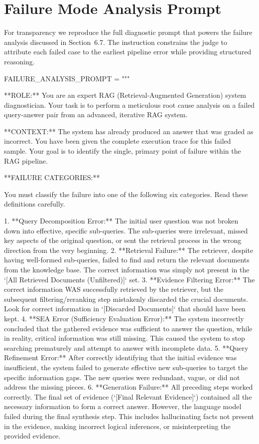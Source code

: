 \documentclass[11pt]{article}
\begin{document}
\section{Failure Mode Analysis Prompt}
\label{sec:appendix-failure}

For transparency we reproduce the full diagnostic prompt that powers the failure analysis discussed in Section~6.7. The instruction constrains the judge to attribute each failed case to the earliest pipeline error while providing structured reasoning.

\begin{PromptBlock}
FAILURE_ANALYSIS_PROMPT = """

**ROLE:** You are an expert RAG (Retrieval-Augmented Generation) system diagnostician. Your task is to perform a meticulous root cause analysis on a failed query-answer pair from an advanced, iterative RAG system.

**CONTEXT:** The system has already produced an answer that was graded as incorrect. You have been given the complete execution trace for this failed sample. Your goal is to identify the single, primary point of failure within the RAG pipeline.

**FAILURE CATEGORIES:**

You must classify the failure into one of the following six categories. Read these definitions carefully.

1.  **Query Decomposition Error:** The initial user question was not broken down into effective, specific sub-queries. The sub-queries were irrelevant, missed key aspects of the original question, or sent the retrieval process in the wrong direction from the very beginning.
2.  **Retrieval Failure:** The retriever, despite having well-formed sub-queries, failed to find and return the relevant documents from the knowledge base. The correct information was simply not present in the `[All Retrieved Documents (Unfiltered)]` set.
3.  **Evidence Filtering Error:** The correct information WAS successfully retrieved by the retriever, but the subsequent filtering/reranking step mistakenly discarded the crucial documents. Look for correct information in `[Discarded Documents]` that should have been kept.
4.  **SEA Error (Sufficiency Evaluation Error):** The system incorrectly concluded that the gathered evidence was sufficient to answer the question, while in reality, critical information was still missing. This caused the system to stop searching prematurely and attempt to answer with incomplete data.
5.  **Query Refinement Error:** After correctly identifying that the initial evidence was insufficient, the system failed to generate effective new sub-queries to target the specific information gaps. The new queries were redundant, vague, or did not address the missing pieces.
6.  **Generation Failure:** All preceding steps worked correctly. The final set of evidence (`[Final Relevant Evidence]`) contained all the necessary information to form a correct answer. However, the language model failed during the final synthesis step. This includes hallucinating facts not present in the evidence, making incorrect logical inferences, or misinterpreting the provided evidence.


\end{PromptBlock}
\end{document}
